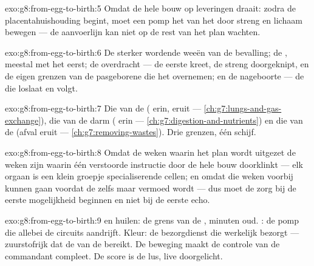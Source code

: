 \begin{solution}{exo:g8:from-egg-to-birth:5}
Omdat de hele bouw op leveringen draait: zodra de placentahuishouding
begint, moet een pomp het  van het  door streng en lichaam
bewegen --- de aanvoerlijn kan niet op de rest van het plan wachten.
\end{solution}

\begin{solution}{exo:g8:from-egg-to-birth:6}
De sterker wordende weeën van de bevalling; de , meestal met het
 eerst; de overdracht --- de eerste kreet, de streng doorgeknipt, en
de eigen grenzen van de pasgeborene die het overnemen; en de nageboorte
--- de  die loslaat en volgt.
\end{solution}

\begin{solution}{exo:g8:from-egg-to-birth:7}
Die van de  ( erin,  eruit ---
\cref{ch:g7:lungs-and-gas-exchange}), die van de darm (
erin --- \cref{ch:g7:digestion-and-nutrients}) en die van de 
(afval eruit --- \cref{ch:g7:removing-wastes}). Drie grenzen, één schijf.
\end{solution}

\begin{solution}{exo:g8:from-egg-to-birth:8}
Omdat de weken waarin het plan wordt uitgezet de weken zijn waarin één
verstoorde instructie door de hele bouw doorklinkt --- elk orgaan is een
klein groepje specialiserende cellen; en omdat die weken voorbij kunnen
gaan voordat de  zelfs maar vermoed wordt --- dus moet de zorg
bij de eerste mogelijkheid beginnen en niet bij de eerste echo.
\end{solution}

\begin{solution}{exo:g8:from-egg-to-birth:9}
 en huilen: de grens van de , minuten oud. : de
pomp die allebei de circuits aandrijft. Kleur: de bezorgdienst die
werkelijk bezorgt --- zuurstofrijk  dat de  van de 
bereikt. De beweging maakt de controle van de commandant compleet. De
score is de lus, live doorgelicht.
\end{solution}

